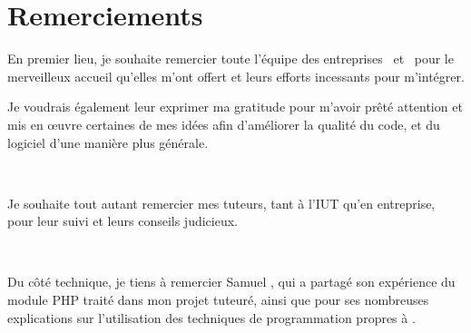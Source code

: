 \chapter*{Remerciements}
En premier lieu, je souhaite remercier toute l'équipe des entreprises \solulog~et \fidit~pour le merveilleux accueil qu'elles m'ont offert et leurs efforts incessants pour m'intégrer.

Je voudrais également leur exprimer ma gratitude pour m'avoir prêté attention et mis en \oe{uvre} certaines de mes idées afin d'améliorer la qualité du code, et du logiciel d'une manière plus générale.

~

Je souhaite tout autant remercier mes tuteurs, tant à l'IUT qu'en entreprise, pour leur suivi et leurs conseils judicieux.

~

Du côté technique, je tiens à remercier Samuel , qui a partagé son expérience du module PHP traité dans mon projet tuteuré, ainsi que pour ses nombreuses explications sur l'utilisation des techniques de programmation propres à \solulog.
